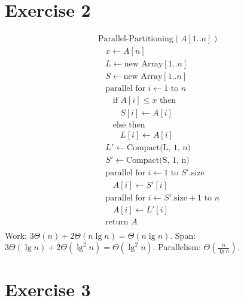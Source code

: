 \documentclass[koma,a4paper]{article}
\begin{document}
\section{Exercise 2}
\begin{align*}
  &\text{Parallel-Partitioning}(A[1..n])\\
  &~~~~x \leftarrow A[n] \\
  &~~~~L \leftarrow \text{new Array}[1..n]\\
  &~~~~S \leftarrow \text{new Array}[1..n]\\
  &~~~~\text{parallel for } i \leftarrow 1 \text{ to } n\\
  &~~~~~~~~\text{if } A[i] \leq x \text{ then}\\
  &~~~~~~~~~~~~S[i] \leftarrow A[i]\\
  &~~~~~~~~\text{else then}\\
  &~~~~~~~~~~~~L[i] \leftarrow A[i]\\
  &~~~~L' \leftarrow \text{Compact(L, 1, n)}\\
  &~~~~S' \leftarrow \text{Compact(S, 1, n)}\\
  &~~~~\text{parallel for } i \leftarrow 1 \text{ to } S'.\text{size}\\
  &~~~~~~~~A[i] \leftarrow S'[i]\\
  &~~~~\text{parallel for } i \leftarrow S'.\text{size}+1 \text{ to } n\\
  &~~~~~~~~A[i] \leftarrow L'[i]\\
  &~~~~\text{return } A\\
\end{align*}
Work: $3\Theta(n)+2\Theta(n \lg n) = \Theta(n \lg n)$. Span: $3\Theta(\lg n)+2\Theta(\lg^2 n)=\Theta(\lg^2 n)$. Parallelism: $\Theta(\frac{n}{\lg n})$.

\section{Exercise 3}
\end{document}
